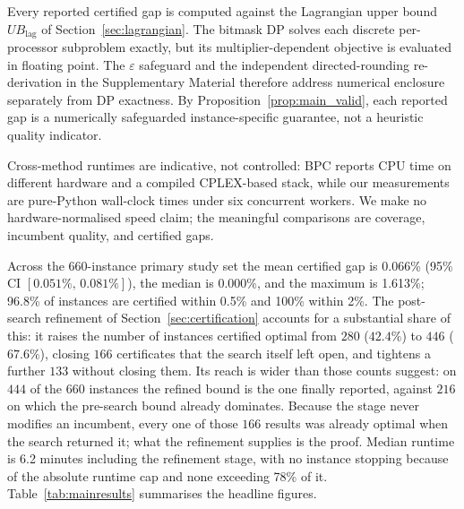 \documentclass[preprint,12pt]{elsarticle}
\begin{document}
Every reported certified gap is computed against the Lagrangian upper bound
$UB_{\text{lag}}$ of Section~\ref{sec:lagrangian}. The bitmask DP solves each
discrete per-processor subproblem exactly, but its multiplier-dependent
objective is evaluated in floating point. The $\varepsilon$ safeguard and the
independent directed-rounding re-derivation in the Supplementary Material
therefore address numerical enclosure separately from DP exactness. By
Proposition~\ref{prop:main_valid}, each reported gap is a numerically
safeguarded instance-specific guarantee, not a heuristic quality indicator.

Cross-method runtimes are indicative, not controlled: BPC reports CPU time on
different hardware and a compiled CPLEX-based stack, while our measurements are
pure-Python wall-clock times under six concurrent workers. We make no
hardware-normalised speed claim; the meaningful comparisons are coverage,
incumbent quality, and certified gaps.

Across the 660-instance primary study set the mean certified gap is 0.066\% (95\% CI $[0.051\%,\,0.081\%]$), the median is 0.000\%, and the maximum is 1.613\%; 96.8\% of instances are certified within 0.5\% and 100\% within 2\%. The post-search refinement of Section~\ref{sec:certification} accounts for a substantial share of this: it raises the number of instances certified optimal from $280$ ($42.4\%$) to $446$ ($67.6\%$), closing $166$ certificates that the search itself left open, and tightens a further $133$ without closing them. Its reach is wider than those counts suggest: on $444$ of the $660$ instances the refined bound is the one finally reported, against $216$ on which the pre-search bound already dominates. Because the stage never modifies an incumbent, every one of those $166$ results was already optimal when the search returned it; what the refinement supplies is the proof. Median runtime is 6.2 minutes including the refinement stage, with no instance stopping because of the absolute runtime cap and none exceeding 78\% of it. Table~\ref{tab:mainresults} summarises the headline figures.
\end{document}
